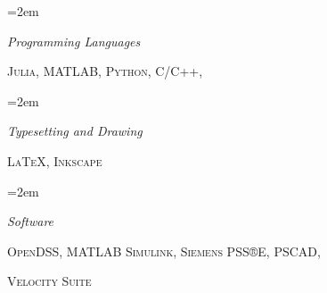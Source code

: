 \documentclass[paper=a4,fontsize=11pt]{scrartcl} %
\newlength{\spacebox}
\newcommand{\sepspace}{\vspace*{1em}}		%
\newcommand{\NewPart}[1]{\section*{\uppercase{#1}}}
\newcommand{\PersonalEntry}[2]{
		\noindent\hangindent=2em\hangafter=0 %
		\parbox{\spacebox}{        %
		\textit{#1}}		       %
		\hspace{1.5em} #2 \par}    %
\newcommand{\SkillsEntry}[2]{      %
		\noindent\hangindent=2em\hangafter=0 %
		\parbox{\spacebox}{        %
		\textit{#1}}			   %
		\hspace{1.5em} #2 \par}    %
\begin{document}

\SkillsEntry{Programming Languages}{\textsc{Julia}, \textsc{MATLAB}, \textsc{Python}, \textsc{C/C++},}
\sepspace

\SkillsEntry{Typesetting and Drawing}{\textsc{\LaTeX}, \textsc{Inkscape}}
\sepspace

\SkillsEntry{Software}{\textsc{OpenDSS}, \textsc{MATLAB Simulink}, \textsc{Siemens PSS®E}, \textsc{PSCAD},}{\textsc{Velocity Suite}}
\sepspace



\end{document}
